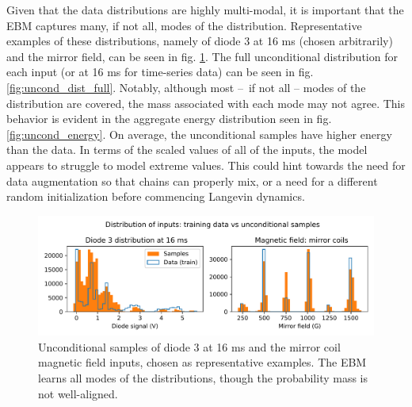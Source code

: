 Given that the data distributions are highly multi-modal, it is important that the EBM captures many, if not all, modes of the distribution. Representative examples of these distributions, namely of diode 3 at 16 ms (chosen arbitrarily) and the mirror field, can be seen in fig. \ref{fig:uncond_examples}. The full unconditional distribution for each input (or at 16 ms for time-series data) can be seen in fig. \ref{fig:uncond_dist_full}. Notably, although most -- if not all -- modes of the distribution are covered, the mass associated with each mode may not agree. This behavior is evident in the aggregate energy distribution seen in fig. \ref{fig:uncond_energy}. On average, the unconditional samples have higher energy than the data. In terms of the scaled values of all of the inputs, the model appears to struggle to model extreme values. This could hint towards the need for data augmentation so that chains can properly mix, or a need for a different random initialization before commencing Langevin dynamics.

\begin{figure}
	\centering
	\includegraphics[width=\linewidth]{figures/uncond_diode-3_B-mirror_39-0.pdf}
	\caption[Unconditional samples -- diode 3 and mirror field]{\label{fig:uncond_examples}Unconditional samples of diode 3 at 16 ms and the mirror coil magnetic field inputs, chosen as representative examples. The EBM learns all modes of the distributions, though the probability mass is not well-aligned.}
\end{figure}

